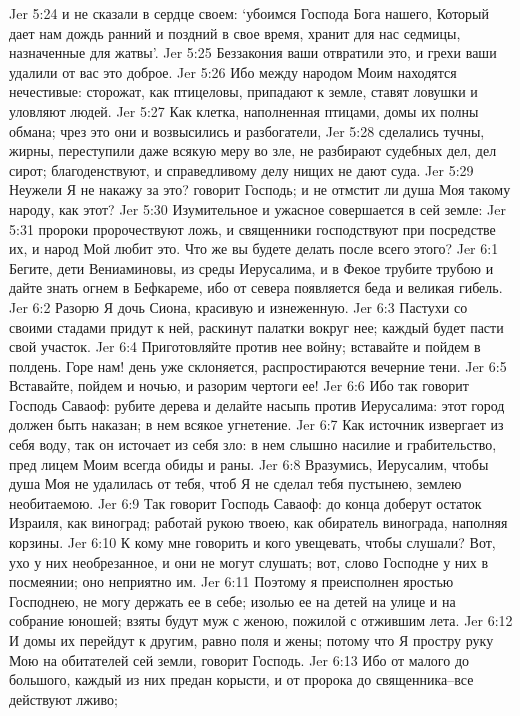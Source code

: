 Jer 5:24  и не сказали в сердце своем: `убоимся Господа Бога нашего, Который дает нам дождь ранний и поздний в свое время, хранит для нас седмицы, назначенные для жатвы'.
Jer 5:25  Беззакония ваши отвратили это, и грехи ваши удалили от вас это доброе.
Jer 5:26  Ибо между народом Моим находятся нечестивые: сторожат, как птицеловы, припадают к земле, ставят ловушки и уловляют людей.
Jer 5:27  Как клетка, наполненная птицами, домы их полны обмана; чрез это они и возвысились и разбогатели,
Jer 5:28  сделались тучны, жирны, переступили даже всякую меру во зле, не разбирают судебных дел, дел сирот; благоденствуют, и справедливому делу нищих не дают суда.
Jer 5:29  Неужели Я не накажу за это? говорит Господь; и не отмстит ли душа Моя такому народу, как этот?
Jer 5:30  Изумительное и ужасное совершается в сей земле:
Jer 5:31  пророки пророчествуют ложь, и священники господствуют при посредстве их, и народ Мой любит это. Что же вы будете делать после всего этого?
Jer 6:1  Бегите, дети Вениаминовы, из среды Иерусалима, и в Фекое трубите трубою и дайте знать огнем в Бефкареме, ибо от севера появляется беда и великая гибель.
Jer 6:2  Разорю Я дочь Сиона, красивую и изнеженную.
Jer 6:3  Пастухи со своими стадами придут к ней, раскинут палатки вокруг нее; каждый будет пасти свой участок.
Jer 6:4  Приготовляйте против нее войну; вставайте и пойдем в полдень. Горе нам! день уже склоняется, распростираются вечерние тени.
Jer 6:5  Вставайте, пойдем и ночью, и разорим чертоги ее!
Jer 6:6  Ибо так говорит Господь Саваоф: рубите дерева и делайте насыпь против Иерусалима: этот город должен быть наказан; в нем всякое угнетение.
Jer 6:7  Как источник извергает из себя воду, так он источает из себя зло: в нем слышно насилие и грабительство, пред лицем Моим всегда обиды и раны.
Jer 6:8  Вразумись, Иерусалим, чтобы душа Моя не удалилась от тебя, чтоб Я не сделал тебя пустынею, землею необитаемою.
Jer 6:9  Так говорит Господь Саваоф: до конца доберут остаток Израиля, как виноград; работай рукою твоею, как обиратель винограда, наполняя корзины.
Jer 6:10  К кому мне говорить и кого увещевать, чтобы слушали? Вот, ухо у них необрезанное, и они не могут слушать; вот, слово Господне у них в посмеянии; оно неприятно им.
Jer 6:11  Поэтому я преисполнен яростью Господнею, не могу держать ее в себе; изолью ее на детей на улице и на собрание юношей; взяты будут муж с женою, пожилой с отжившим лета.
Jer 6:12  И домы их перейдут к другим, равно поля и жены; потому что Я простру руку Мою на обитателей сей земли, говорит Господь.
Jer 6:13  Ибо от малого до большого, каждый из них предан корысти, и от пророка до священника--все действуют лживо;
